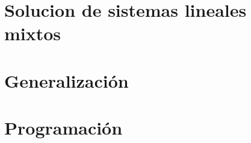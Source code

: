 	

\section{Solucion de sistemas lineales mixtos}





\section{Generalización}



\section{Programación}



